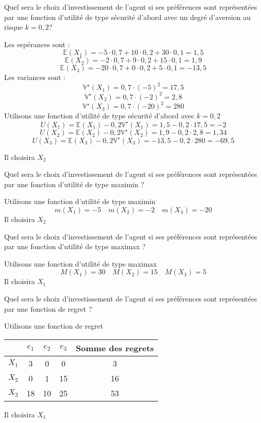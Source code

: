 \documentclass[12pt, a4paper]{exam}
\begin{document}
\begin{questions}
	\question[1,25] Quel sera le choix d'investissement de l'agent si ses préférences sont représentées par une fonction d'utilité de type sécurité d'abord avec un degré d'aversion au risque \(k=0,2\)?


\begin{solution}
Les espérances sont : 
\[ 
\mathbb{E}(X_1)=-5\cdot0,7+10\cdot0,2+30\cdot0,1=1,5
 \]
 \[ 
\mathbb{E}(X_2)=-2\cdot0,7+9\cdot0,2+15\cdot0,1=1,9
 \]
  \[ 
\mathbb{E}(X_3)=-20\cdot0,7+0\cdot0,2+5\cdot0,1=-13,5
 \]
Les variances sont : 
 \[ 
\mathbb{V}^{\star}(X_1)= 0,7\cdot(-5)^2=17,5
 \]
 \[ 
\mathbb{V}^{\star}(X_2)= 0,7\cdot(-2)^2=2,8
\]
 \[ 
\mathbb{V}^{\star}(X_3)= 0,7\cdot(-20)^2=280
\]
Utilisons une fonction d'utilité de type sécurité d'abord avec \(k=0,2\)
\[ 
U(X_1)=\mathbb{E}(X_1)-0,2\mathbb{V}^{\star}(X_1)=1,5 -0,2\cdot17,5=-2
 \]
 \[ 
U(X_2)=\mathbb{E}(X_2)-0,2\mathbb{V}^{\star}(X_2)=1,9 -0,2\cdot2,8=1,34
  \]
 \[ 
U(X_3)=\mathbb{E}(X_3)-0,2\mathbb{V}^{\star}(X_3)=-13,5-0,2\cdot280=-69,5
\] 

Il choisira \(X_2\)
 
\end{solution}


	\question[1,25] Quel sera le choix d'investissement de l'agent si ses préférences sont représentées par une fonction d'utilité de type maximin ?


\begin{solution}
Utilisons une fonction d'utilité de type maximin
\[ 
m(X_1)=-5 \quad m(X_2)=-2 \quad m(X_3)=-20
 \]
Il choisira \(X_2\)
\end{solution}

\question[1,25] Quel sera le choix d'investissement de l'agent si ses préférences sont représentées par une fonction d'utilité de type maximax ?


\begin{solution}
	Utilisons une fonction d'utilité de type maximax
	\[ 
	M(X_1)=30 \quad M(X_2)=15 \quad M(X_3)=5
	\]
	Il choisira \(X_1\)
\end{solution}


\question[1,25] Quel sera le choix d'investissement de l'agent si ses préférences sont représentées par une fonction de regret ?

\begin{solution}
	Utilisons une fonction de regret 
\begin{center}
\begin{tabular}{@{}ccccc@{}}
	\toprule
	& $e_1$ & $e_2$ & $e_3$ & Somme des regrets \\ \midrule
	$X_1$ & 3     & 0     & 0     & 3                 \\
	$X_2$ & 0     & 1     & 15    & 16                \\
	$X_3$ & 18    & 10    & 25    & 53                \\ \bottomrule
\end{tabular}
\end{center}
Il choisira \(X_1\)

\end{solution}

\end{questions}




\label{LastPage}
\end{document}
